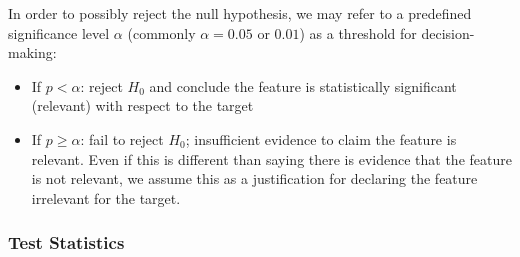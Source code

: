 
In order to possibly reject the null hypothesis, we may refer to a predefined \alert{significance level} $\alpha$ (commonly $\alpha = 0.05$ or $0.01$) as a threshold for decision-making:
\begin{itemize}
\item If $p < \alpha$: reject $H_0$ and conclude the feature is \alert{statistically significant} (relevant) with respect to the target
\item If $p \geq \alpha$: fail to reject $H_0$; insufficient evidence to claim the feature is relevant. Even if this is different than saying there is evidence that the feature is not relevant, we assume this as a justification for declaring the feature irrelevant for the target.
\end{itemize}


\subsubsection*{Test Statistics}

